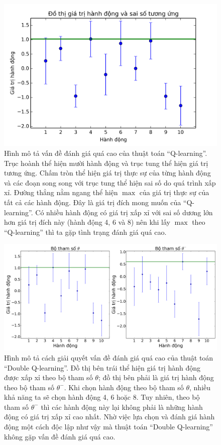 	\begin{figure}
		\centering
		\includegraphics[width=\textwidth]{q_learning}
		\caption[Vấn đề đánh giá quá cao của thuật toán ``Q-learning'']{Hình mô tả vấn đề đánh giá quá cao của thuật toán ``Q-learning''.
		Trục hoành thể hiện mười hành động và trục tung thể hiện giá trị tương ứng.
		Chấm tròn thể hiện giá trị thực sự của từng hành động và các đoạn song song với trục tung thể hiện sai số do quá trình xấp xỉ.
		Đường thẳng nằm ngang thể hiện $\max$ của giá trị thực sự của tất cả các hành động.
		Đây là giá trị đích mong muốn của ``Q-learning''.
		Có nhiều hành động có giá trị xấp xỉ với sai số dương lớn hơn giá trị đích này (hành động 4, 6 và 8) nên khi lấy $\max$ theo ``Q-learning'' thì ta gặp tình trạng đánh giá quá cao.}
		\label{fig_q_learning_plot}
	\end{figure}
	
	\begin{figure}
		\centering
		\includegraphics[width=\textwidth]{double_q_learning}
		\caption[Cách giải quyết vấn đề đánh giá quá cao của thuật toán ``Double Q-learning'']{Hình mô tả cách giải quyết vấn đề đánh giá quá cao của thuật toán ``Double Q-learning''.
		Đồ thị bên trái thể hiện giá trị hành động được xấp xỉ theo bộ tham số $\theta$; đồ thị bên phải là giá trị hành động theo bộ tham số $\theta^{-}$.
		Khi chọn hành động theo bộ tham số $\theta$, nhiều khả năng ta sẽ chọn hành động 4, 6 hoặc 8.
		Tuy nhiên, theo bộ tham số $\theta^{-}$ thì các hành động này lại không phải là những hành động có giá trị xấp xỉ cao nhất.
		Nhờ việc lựa chọn và đánh giá hành động một cách độc lập như vậy mà thuật toán ``Double Q-learning'' không gặp vấn đề đánh giá quá cao.}
		\label{fig_double_q_learning_plot}
	\end{figure}
	
